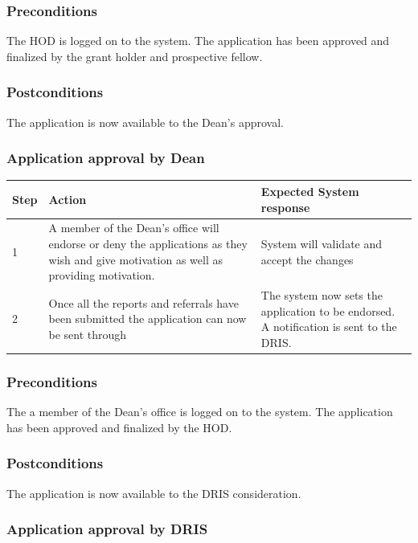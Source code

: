 \documentclass[12pt]{article}
\begin{document}
\subsubsection*{Preconditions}
The HOD is logged on to the system. The application has been approved and finalized by the grant holder and prospective fellow.

\subsubsection*{Postconditions}
The application is now available to the Dean's approval.

\subsubsection{Application approval by Dean}

\begin{center}
\begin{tabular}{|l|p{6cm}|p{8cm}|}
\hline
Step & Action & Expected System response \\
\hline
1 & A member of the Dean's office will endorse or deny the applications as they wish and give motivation as well as providing motivation.  & System will validate and accept the changes\\
\hline
2 & Once all the reports and referrals have been submitted the application can now be sent through  & The system now sets the application to be endorsed. A notification is sent to the DRIS. \\
\hline
\end{tabular}
\end{center}

\subsubsection*{Preconditions}
The a member of the Dean's office is logged on to the system. The application has been approved and finalized by the HOD.

\subsubsection*{Postconditions}
The application is now available to the DRIS consideration.

\subsubsection{Application approval by DRIS}
\end{document}
